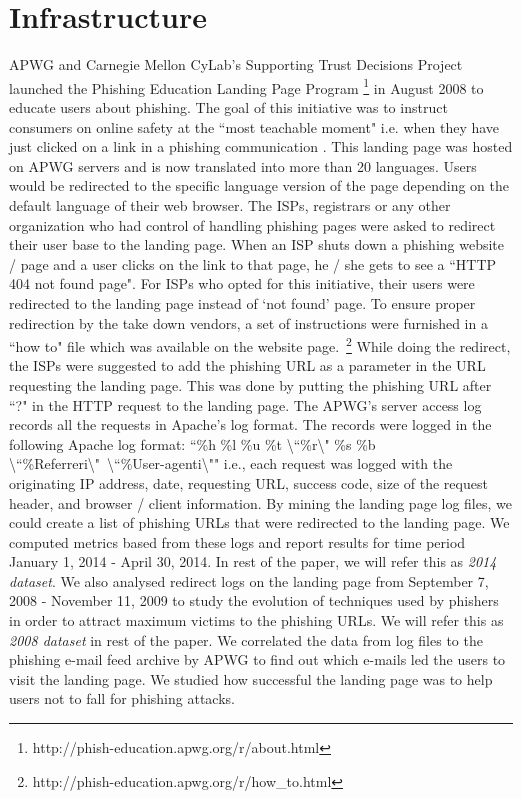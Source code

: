 \documentclass[conference]{IEEEtran}
\begin{document}
\section{Infrastructure}
APWG and Carnegie Mellon CyLab's Supporting Trust Decisions Project launched the Phishing Education Landing Page Program \footnote{http://phish-education.apwg.org/r/about.html} in August 2008 to educate users about phishing. The goal of this initiative was to instruct consumers on online safety at the ``most teachable moment" i.e. when they have just clicked on a link in a phishing communication \cite{pk-phd}. This landing page was hosted on APWG servers and is now translated into more than 20 languages. Users would be redirected to the specific language version of the page depending on the default language of their web browser. The ISPs, registrars or any other organization who had control of handling phishing pages were asked to redirect their user base to the landing page. When an ISP shuts down a phishing website / page and a user clicks on the link to that page, he / she gets to see a ``HTTP 404 not found page". For ISPs who opted for this initiative, their users were redirected to the landing page instead of `not found' page. To ensure proper redirection by the take down vendors, a set of instructions were furnished in a ``how to" file which was available on the website page.~\footnote{http://phish-education.apwg.org/r/how\_to.html} While doing the redirect, the ISPs were suggested to add the phishing URL as a parameter in the URL requesting the landing page. This was done by putting the phishing URL after ``?" in the HTTP request to the landing page.
\newline
\indent The APWG's server access log records all the requests in Apache's log format. The records were logged in the following Apache log format: ``\textbraceleft \%h \%l \%u \%t \textbackslash``\%r\textbackslash" \%s \%b \textbackslash``\%\textbraceleft Referrer\textbraceright i\textbackslash"~\textbackslash``\%\textbraceleft User-agent\textbraceright i\textbackslash"\textbraceright" i.e., each request was logged with the originating IP address, date, requesting URL, success code, size of the request header, and browser / client information. By mining the landing page log files, we could create a list of phishing URLs that were redirected to the landing page. We computed metrics based from these logs and report results for time period January 1, 2014 - April 30, 2014. In rest of the paper, we will refer this as \textit{2014 dataset}. We also analysed redirect logs on the landing page from September 7, 2008 - November 11, 2009 to study the evolution of techniques used by phishers in order to attract maximum victims to the phishing URLs. We will refer this as \textit{2008 dataset} in rest of the paper. We correlated the data from log files to the phishing e-mail feed archive by APWG to find out which e-mails led the users to visit the landing page. We studied how successful the landing page was to help users not to fall for phishing attacks.
\end{document}
